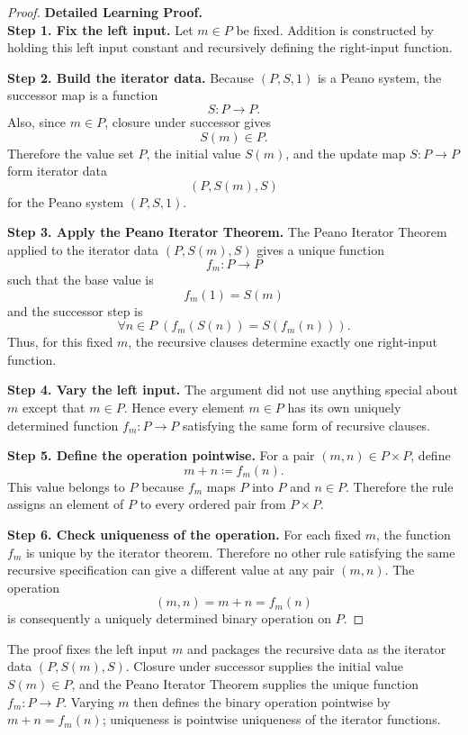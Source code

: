 \begin{proof}
\textbf{Detailed Learning Proof.}~\\
\textbf{Step 1. Fix the left input.}
Let $m\in P$ be fixed. Addition is constructed by holding this left input
constant and recursively defining the right-input function.

\textbf{Step 2. Build the iterator data.}
Because $(P,S,1)$ is a Peano system, the successor map is a function
\[
S:P\to P.
\]
Also, since $m\in P$, closure under successor gives
\[
S(m)\in P.
\]
Therefore the value set $P$, the initial value $S(m)$, and the update map
$S:P\to P$ form iterator data
\[
(P,S(m),S)
\]
for the Peano system $(P,S,1)$.

\textbf{Step 3. Apply the Peano Iterator Theorem.}
The Peano Iterator Theorem applied to the iterator data $(P,S(m),S)$ gives a
unique function
\[
f_m:P\to P
\]
such that the base value is
\[
f_m(1)=S(m)
\]
and the successor step is
\[
\forall n\in P\;(f_m(S(n))=S(f_m(n))).
\]
Thus, for this fixed $m$, the recursive clauses determine exactly one
right-input function.

\textbf{Step 4. Vary the left input.}
The argument did not use anything special about $m$ except that $m\in P$.
Hence every element $m\in P$ has its own uniquely determined function
$f_m:P\to P$ satisfying the same form of recursive clauses.

\textbf{Step 5. Define the operation pointwise.}
For a pair $(m,n)\in P\times P$, define
\[
m+n\coloneqq f_m(n).
\]
This value belongs to $P$ because $f_m$ maps $P$ into $P$ and $n\in P$.
Therefore the rule assigns an element of $P$ to every ordered pair from
$P\times P$.

\textbf{Step 6. Check uniqueness of the operation.}
For each fixed $m$, the function $f_m$ is unique by the iterator theorem.
Therefore no other rule satisfying the same recursive specification can give
a different value at any pair $(m,n)$. The operation
\[
(m,n)=m+n=f_m(n)
\]
is consequently a uniquely determined binary operation on $P$.
\end{proof}

\begin{remark*}
The proof fixes the left input $m$ and packages the recursive data as the
iterator data $(P,S(m),S)$. Closure under successor supplies the initial value
$S(m)\in P$, and the Peano Iterator Theorem supplies the unique function
$f_m:P\to P$. Varying $m$ then defines the binary operation pointwise by
$m+n=f_m(n)$; uniqueness is pointwise uniqueness of the iterator functions.
\end{remark*}

